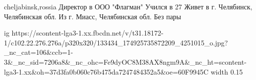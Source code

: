  
 
 
 
 

cheljabinsk,rossia
Директор в ООО "Флагман"
Учился в 27
Живет в г. Челябинск, Челябинская обл.
Из г. Миасс, Челябинская обл.
Без пары
\par
\ifcmt
  ig https://scontent-lga3-1.xx.fbcdn.net/v/t31.18172-1/c102.22.276.276a/p320x320/133434_174925735872209_4251015_o.jpg?_nc_cat=106&ccb=1-3&_nc_sid=7206a8&_nc_ohc=Fe9dyOC8M38AX8ngm9A&_nc_ht=scontent-lga3-1.xx&oh=37d3fa0b060c76b475da7247484352a5&oe=60F9945C
  width 0.15
\fi
